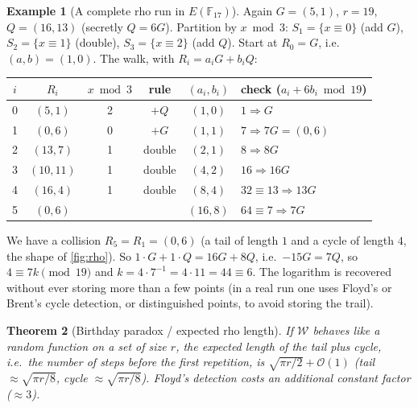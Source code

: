 \documentclass[11pt,a4paper,oneside]{book}
\theoremstyle{plain}
\newtheorem{theorem}{Theorem}[chapter]
\theoremstyle{definition}
\newtheorem{example}[theorem]{Example}
\theoremstyle{remark}
\newcommand{\F}{\mathbb{F}}
\newcommand{\bigO}{\mathcal{O}}
\begin{document}
\begin{example}[A complete rho run in $E(\F_{17})$]\label{ex:rho}
Again $G=(5,1)$, $r=19$, $Q=(16,13)$ (secretly $Q=6G$). Partition by $x\bmod3$: $S_1=\{x\equiv0\}$ (add $G$), $S_2=\{x\equiv1\}$ (double), $S_3=\{x\equiv2\}$ (add $Q$). Start at $R_0=G$, i.e.\ $(a,b)=(1,0)$. The walk, with $R_i=a_iG+b_iQ$:
\begin{center}
\small
\begin{tabular}{@{}cccccl@{}}
\toprule
$i$ & $R_i$ & $x\bmod3$ & rule & $(a_i,b_i)$ & check ($a_i+6b_i\bmod19$)\\
\midrule
0 & $(5,1)$ & 2 & $+Q$ & $(1,0)$ & $1\Rightarrow G$\\
1 & $(0,6)$ & 0 & $+G$ & $(1,1)$ & $7\Rightarrow7G=(0,6)$\\
2 & $(13,7)$ & 1 & double & $(2,1)$ & $8\Rightarrow8G$\\
3 & $(10,11)$ & 1 & double & $(4,2)$ & $16\Rightarrow16G$\\
4 & $(16,4)$ & 1 & double & $(8,4)$ & $32\equiv13\Rightarrow13G$\\
5 & $(0,6)$ & & & $(16,8)$ & $64\equiv7\Rightarrow7G$\\
\bottomrule
\end{tabular}
\end{center}
We have a collision $R_5=R_1=(0,6)$ (a tail of length $1$ and a cycle of length $4$, the shape of \cref{fig:rho}). So $1\cdot G+1\cdot Q=16G+8Q$, i.e.\ $-15G=7Q$, so $4\equiv7k\pmod{19}$ and $k=4\cdot7^{-1}=4\cdot11=44\equiv6$. The logarithm is recovered without ever storing more than a few points (in a real run one uses Floyd's or Brent's cycle detection, or distinguished points, to avoid storing the trail).
\end{example}

\begin{theorem}[Birthday paradox / expected rho length]\label{thm:rho}
If $\mathcal W$ behaves like a random function on a set of size $r$, the expected length of the tail plus cycle, i.e.\ the number of steps before the first repetition, is $\sqrt{\pi r/2}+\bigO(1)$ (tail $\approx\sqrt{\pi r/8}$, cycle $\approx\sqrt{\pi r/8}$). Floyd's detection costs an additional constant factor ($\approx3$).
\end{theorem}
\end{document}

